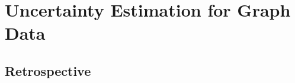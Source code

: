 \chapter{Uncertainty Estimation for Graph Data}
\label{chap:graph_data}







\section*{Retrospective}
%